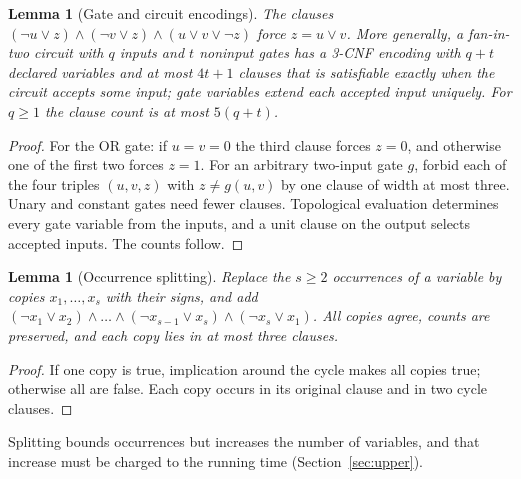 \documentclass[11pt,reqno]{amsart}
\numberwithin{equation}{section}
\theoremstyle{plain}
\newtheorem{lemma}[theorem]{Lemma}
\theoremstyle{definition}
\theoremstyle{remark}
\begin{document}
\begin{lemma}[Gate and circuit encodings]\label{lem:gates}
The clauses $(\neg u\lor z)\land(\neg v\lor z)\land(u\lor v\lor\neg z)$ force
$z=u\lor v$. More generally, a fan-in-two circuit with $q$ inputs and $t$
noninput gates has a 3-CNF encoding with $q+t$ declared variables and at most
$4t+1$ clauses that is satisfiable exactly when the circuit accepts some
input; gate variables extend each accepted input uniquely. For $q\ge1$ the
clause count is at most $5(q+t)$.
\end{lemma}
\begin{proof}
For the OR gate: if $u=v=0$ the third clause forces $z=0$, and otherwise one
of the first two forces $z=1$. For an arbitrary two-input gate $g$, forbid
each of the four triples $(u,v,z)$ with $z\ne g(u,v)$ by one clause of width
at most three. Unary and constant gates need fewer clauses. Topological
evaluation determines every gate variable from the inputs, and a unit clause
on the output selects accepted inputs. The counts follow.
\end{proof}

\begin{lemma}[Occurrence splitting]\label{lem:cycle}
Replace the $s\ge2$ occurrences of a variable by copies $x_1,\dots,x_s$ with
their signs, and add $(\neg x_1\lor x_2)\land\dots\land(\neg x_{s-1}\lor
x_s)\land(\neg x_s\lor x_1)$. All copies agree, counts are preserved, and
each copy lies in at most three clauses.
\end{lemma}
\begin{proof}
If one copy is true, implication around the cycle makes all copies true;
otherwise all are false. Each copy occurs in its original clause and in two
cycle clauses.
\end{proof}
Splitting bounds occurrences but increases the number of variables, and that
increase must be charged to the running time (Section~\ref{sec:upper}).
\end{document}
